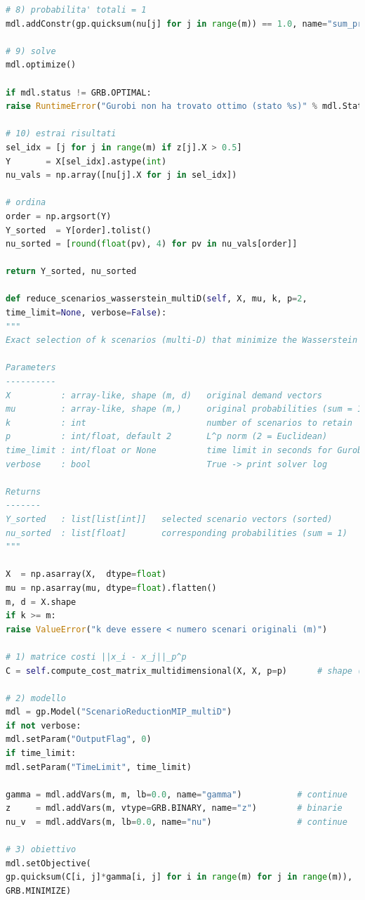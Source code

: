 \documentclass[a4paper,12pt]{article}
\begin{document}
\begin{lstlisting}[language=python,caption={class ScenarioTree},label={lst:class-scenario-tree}]
# 8) probabilita' totali = 1
mdl.addConstr(gp.quicksum(nu[j] for j in range(m)) == 1.0, name="sum_prob")

# 9) solve
mdl.optimize()

if mdl.status != GRB.OPTIMAL:
raise RuntimeError("Gurobi non ha trovato ottimo (stato %s)" % mdl.Status)

# 10) estrai risultati
sel_idx = [j for j in range(m) if z[j].X > 0.5]
Y       = X[sel_idx].astype(int)
nu_vals = np.array([nu[j].X for j in sel_idx])

# ordina
order = np.argsort(Y)
Y_sorted  = Y[order].tolist()
nu_sorted = [round(float(pv), 4) for pv in nu_vals[order]]

return Y_sorted, nu_sorted

def reduce_scenarios_wasserstein_multiD(self, X, mu, k, p=2,
time_limit=None, verbose=False):
"""
Exact selection of k scenarios (multi-D) that minimize the Wasserstein p-norm distance via MILP (Gurobi).

Parameters
----------
X          : array-like, shape (m, d)   original demand vectors
mu         : array-like, shape (m,)     original probabilities (sum = 1)
k          : int                        number of scenarios to retain
p          : int/float, default 2       L^p norm (2 = Euclidean)
time_limit : int/float or None          time limit in seconds for Gurobi
verbose    : bool                       True -> print solver log

Returns
-------
Y_sorted   : list[list[int]]   selected scenario vectors (sorted)
nu_sorted  : list[float]       corresponding probabilities (sum = 1)
"""

X  = np.asarray(X,  dtype=float)
mu = np.asarray(mu, dtype=float).flatten()
m, d = X.shape
if k >= m:
raise ValueError("k deve essere < numero scenari originali (m)")

# 1) matrice costi ||x_i - x_j||_p^p
C = self.compute_cost_matrix_multidimensional(X, X, p=p)      # shape (m, m)

# 2) modello 
mdl = gp.Model("ScenarioReductionMIP_multiD")
if not verbose:
mdl.setParam("OutputFlag", 0)
if time_limit:
mdl.setParam("TimeLimit", time_limit)

gamma = mdl.addVars(m, m, lb=0.0, name="gamma")           # continue
z     = mdl.addVars(m, vtype=GRB.BINARY, name="z")        # binarie
nu_v  = mdl.addVars(m, lb=0.0, name="nu")                 # continue

# 3) obiettivo
mdl.setObjective(
gp.quicksum(C[i, j]*gamma[i, j] for i in range(m) for j in range(m)),
GRB.MINIMIZE)


\end{lstlisting}
\end{document}
